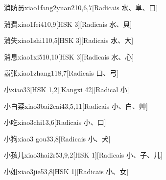 \begin{entry}{消防员}{xiao1fang2yuan2}{10,6,7}[Radicais ⽔、⾩、⼝]
\end{entry}

\begin{entry}{消费}{xiao1fei4}{10,9}[HSK 3][Radicais ⽔、⾙]
\end{entry}

\begin{entry}{消失}{xiao1shi1}{10,5}[HSK 3][Radicais ⽔、⼤]
\end{entry}

\begin{entry}{消息}{xiao1xi5}{10,10}[HSK 3][Radicais ⽔、⼼]
\end{entry}

\begin{entry}{嚣张}{xiao1zhang1}{18,7}[Radicais ⼝、⼸]
\end{entry}

\begin{entry}{小}{xiao3}{3}[HSK 1,2][Kangxi 42][Radical ⼩]
\end{entry}

\begin{entry}{小白菜}{xiao3bai2cai4}{3,5,11}[Radicais ⼩、⽩、⾋]
\end{entry}

\begin{entry}{小吃}{xiao3chi1}{3,6}[Radicais ⼩、⼝]
\end{entry}

\begin{entry}{小狗}{xiao3 gou3}{3,8}[Radicais ⼩、⽝]
\end{entry}

\begin{entry}{小孩儿}{xiao3hai2r5}{3,9,2}[HSK 1][Radicais ⼩、⼦、⼉]
\end{entry}

\begin{entry}{小姐}{xiao3jie5}{3,8}[HSK 1][Radicais ⼩、⼥]
\end{entry}

